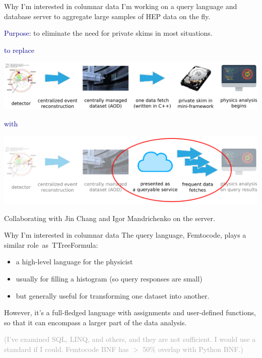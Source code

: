 \documentclass{beamer}
\begin{document}
\begin{frame}{Why I'm interested in columnar data}
\vspace{0.5 cm}
I'm working on a query language and database server to aggregate large samples of HEP data on the fly.

\vspace{0.3 cm}
\textcolor{darkblue}{Purpose:} to eliminate the need for private skims in most situations.

\vspace{0.3 cm}
\begin{center}
\large \textcolor{darkblue}{to replace}

\includegraphics[width=0.8\linewidth]{workflow.png}
\end{center}

\begin{center}
\large \textcolor{darkblue}{with}

\includegraphics[width=0.8\linewidth]{workflow2.png}
\end{center}

\scriptsize
\vspace{-0.2 cm}
Collaborating with Jin Chang and Igor Mandrichenko on the server.
\end{frame}

\begin{frame}{Why I'm interested in columnar data}
The query language, Femtocode, plays a similar \mbox{role as TTreeFormula:\hspace{-1 cm}}
\begin{itemize}
\item a high-level language for the physicist
\item usually for filling a histogram (so query responses are small)
\item but generally useful for transforming one dataset into another.
\end{itemize}

\vspace{0.3 cm}
However, it's a full-fledged language with assignments and user-defined functions, so that it can encompass a larger part of the data analysis.

\vspace{0.3 cm}
\textcolor{darkgray}{(I've examined SQL, LINQ, and others, and they are not sufficient. I would use a standard if I could. Femtocode BNF has $>$ 50\% overlap with Python BNF.)}
\end{frame}
\end{document}
